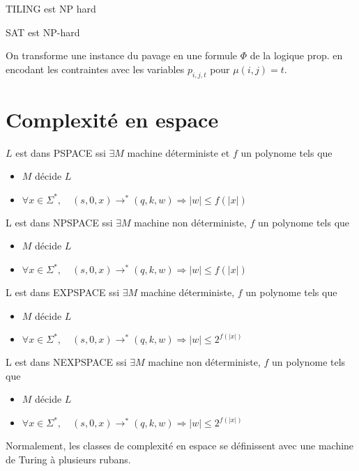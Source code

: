 \documentclass[10pt,a4paper]{article}
\begin{document}
\begin{thm}
 TILING est NP hard
\end{thm}

\begin{thm}
  SAT est NP-hard
\end{thm}


\begin{dem}
 On transforme une instance du pavage en une formule $\Phi$ de la logique prop. en encodant les contraintes avec les variables $p_{i,j,t}$ pour $\mu(i,j) = t$.
\end{dem}



\section{Complexité en espace}
\begin{definition}{}$L$ est dans PSPACE ssi $\exists M$ machine déterministe et $f$ un polynome tels que \begin{itemize}
\item $M$ décide $L$
\item $\forall x \in \Sigma^*, \quad (s,0,x) \rightarrow^* (q, k, w) \Longrightarrow  | w |  \leq f( | x | )$
\end{itemize}\end{definition}
\begin{definition}{}L est dans NPSPACE ssi $\exists M$ machine non déterministe, $f$ un polynome tels que \begin{itemize}
\item $M$ décide $L$
\item $\forall x \in \Sigma^*, \quad (s,0,x) \rightarrow^* (q, k, w) \Longrightarrow  | w |  \leq f( | x | )$
\end{itemize}\end{definition}
\begin{definition}{}L est dans EXPSPACE ssi $\exists M$ machine déterministe, $f$ un polynome tels que \begin{itemize}
\item $M$ décide $L$
\item $\forall x \in \Sigma^*, \quad (s,0,x) \rightarrow^* (q, k, w) \Longrightarrow  | w |  \leq 2^{f( | x | )}$
\end{itemize}\end{definition}
\begin{definition}{}L est dans NEXPSPACE ssi $\exists M$ machine non déterministe, $f$ un polynome tels que \begin{itemize}
\item $M$ décide $L$
\item $\forall x \in \Sigma^*,  \quad (s,0,x) \rightarrow^* (q, k, w) \Longrightarrow  | w |  \leq 2^{f( | x | )}$
\end{itemize}\end{definition}
\begin{rem}
 Normalement, les classes de complexité en espace se définissent avec une machine de Turing à plusieurs rubans.
\end{rem}
\end{document}
